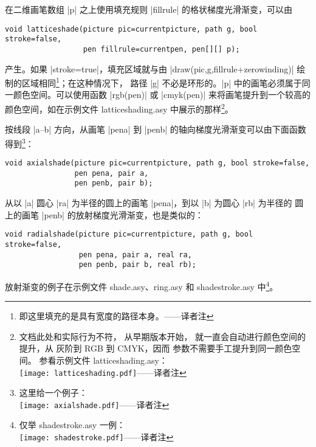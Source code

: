 \documentclass[nofonts,CJKnormalspaces]{ctexbook}[2009/05/20]
\newcommand*\prgname[1]{\textsf{#1}}
\newcommand\transnote[1]{\footnote{#1——译者注}}
\begin{document}
在二维画笔数组 |p| 之上使用填充规则 |fillrule| 的格状梯度光滑渐变，可以由
\begin{lstlisting}
void latticeshade(picture pic=currentpicture, path g, bool stroke=false,
                  pen fillrule=currentpen, pen[][] p);
\end{lstlisting}
产生。如果 |stroke=true|，填充区域就与由 |draw(pic,g,fillrule+zerowinding)|
绘制的区域相同\transnote{即这里填充的是具有宽度的路径本身。}；在这种情况下，
路径 |g| 不必是环形的。|p| 中的画笔必须属于同一颜色空间。可以使用函数
|rgb(pen)| 或 |cmyk(pen)| 来将画笔提升到一个较高的颜色空间，如在示例文件
\prgname{latticeshading.asy} 中展示的那样\transnote{文档此处和实际行为不符，
从早期版本开始， 就一直会自动进行颜色空间的提升，从
灰阶到 RGB 到 CMYK，因而 \inlinecode{p} 参数不需要手工提升到同一颜色空间。
参看示例文件 \prgname{latticeshading.asy}：\\
\setbox0\vbox{}%
\texttt{[image: latticeshading.pdf]}\box0}。

按线段 |a--b| 方向，从画笔 |pena| 到 |penb| 的轴向梯度光滑渐变可以由下面函数
得到\transnote{这里给一个例子：\\
\vbox{}%
\texttt{[image: axialshade.pdf]}\box0}：
\begin{lstlisting}
void axialshade(picture pic=currentpicture, path g, bool stroke=false,
                pen pena, pair a,
                pen penb, pair b);
\end{lstlisting}

从以 |a| 圆心 |ra| 为半径的圆上的画笔 |pena|，到以 |b| 为圆心 |rb| 为半径的
圆上的画笔 |penb| 的放射梯度光滑渐变，也是类似的：
\begin{lstlisting}
void radialshade(picture pic=currentpicture, path g, bool stroke=false,
                 pen pena, pair a, real ra,
                 pen penb, pair b, real rb);
\end{lstlisting}
放射渐变的例子在示例文件 \prgname{shade.asy}、\prgname{ring.asy} 和
\prgname{shadestroke.asy} 中\transnote{仅举 \prgname{shadestroke.asy}
一例：\\
\vbox{}%
\texttt{[image: shadestroke.pdf]}\box0}。
\end{document}
